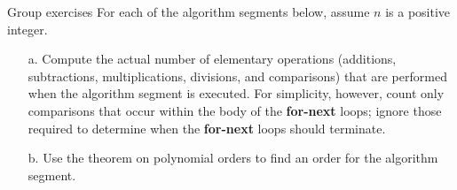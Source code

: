 \documentclass[10pt]{beamer}
\begin{document}
\begin{frame}{Group exercises}
For each of the algorithm segments below, assume $n$ is a positive integer. 
\begin{itemize}
\item[a.] Compute the actual number of elementary operations (additions, subtractions, multiplications, divisions, and comparisons) that are performed when the algorithm segment is executed.  For simplicity, however, count only comparisons that occur within the body of the \textbf{for-next} loops; ignore those required to determine when the \textbf{for-next} loops should terminate. 
\item[b.] Use the theorem on polynomial orders to find an order for the algorithm segment.	
\end{itemize}





\end{frame}
\end{document}

